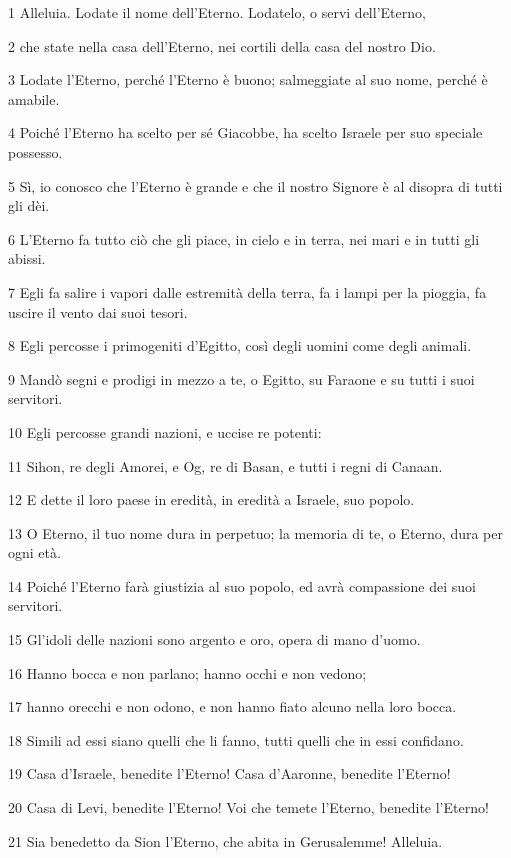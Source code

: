 \par 1 Alleluia. Lodate il nome dell'Eterno. Lodatelo, o servi dell'Eterno,
\par 2 che state nella casa dell'Eterno, nei cortili della casa del nostro Dio.
\par 3 Lodate l'Eterno, perché l'Eterno è buono; salmeggiate al suo nome, perché è amabile.
\par 4 Poiché l'Eterno ha scelto per sé Giacobbe, ha scelto Israele per suo speciale possesso.
\par 5 Sì, io conosco che l'Eterno è grande e che il nostro Signore è al disopra di tutti gli dèi.
\par 6 L'Eterno fa tutto ciò che gli piace, in cielo e in terra, nei mari e in tutti gli abissi.
\par 7 Egli fa salire i vapori dalle estremità della terra, fa i lampi per la pioggia, fa uscire il vento dai suoi tesori.
\par 8 Egli percosse i primogeniti d'Egitto, così degli uomini come degli animali.
\par 9 Mandò segni e prodigi in mezzo a te, o Egitto, su Faraone e su tutti i suoi servitori.
\par 10 Egli percosse grandi nazioni, e uccise re potenti:
\par 11 Sihon, re degli Amorei, e Og, re di Basan, e tutti i regni di Canaan.
\par 12 E dette il loro paese in eredità, in eredità a Israele, suo popolo.
\par 13 O Eterno, il tuo nome dura in perpetuo; la memoria di te, o Eterno, dura per ogni età.
\par 14 Poiché l'Eterno farà giustizia al suo popolo, ed avrà compassione dei suoi servitori.
\par 15 Gl'idoli delle nazioni sono argento e oro, opera di mano d'uomo.
\par 16 Hanno bocca e non parlano; hanno occhi e non vedono;
\par 17 hanno orecchi e non odono, e non hanno fiato alcuno nella loro bocca.
\par 18 Simili ad essi siano quelli che li fanno, tutti quelli che in essi confidano.
\par 19 Casa d'Israele, benedite l'Eterno! Casa d'Aaronne, benedite l'Eterno!
\par 20 Casa di Levi, benedite l'Eterno! Voi che temete l'Eterno, benedite l'Eterno!
\par 21 Sia benedetto da Sion l'Eterno, che abita in Gerusalemme! Alleluia.

